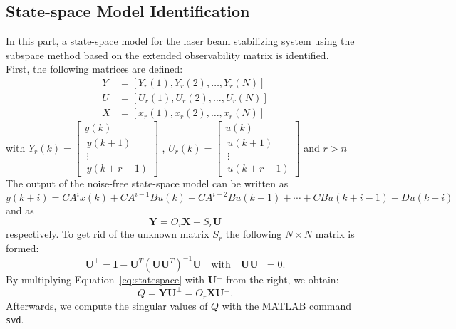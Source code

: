 \subsection{State-space Model Identification}
In this part, a state-space model for the laser beam stabilizing system using the subspace method based on the extended observability matrix is identified. \\
First, the following matrices are defined: 
\begin{align}
 Y &= \left[Y_r(1), Y_r(2),\ldots,Y_r(N) \right] \\
 U &= \left[U_r(1), U_r(2),\ldots,U_r(N) \right] \\
 X &= \left[x_r(1), x_r(2),\ldots,x_r(N) \right]
\end{align}
with 
\quad $Y_r(k) = \left[ \begin{array}{c} y(k) \\\ y(k+1) \\\ \vdots \\\ y(k + r -1) \end{array}\right] $ , \quad $U_r(k) = \left[ \begin{array}{c} u(k) \\\ u(k+1) \\\ \vdots \\\ u(k + r -1) \end{array}\right] $ \quad and \quad $r > n $\\
The output of the noise-free state-space model can be written as
\begin{equation}
y(k+i) = CA^{i}x(k) + CA^{i-1}Bu(k) + CA^{i-2}Bu(k+1) + \cdots + CBu(k+i-1) + Du(k+i)
\end{equation}
and as 
\begin{equation}
\textbf{Y} = O_r \textbf{X} + S_r \textbf{U}
\label{eq:statespace}
\end{equation}
respectively. 
To get rid of the unknown matrix $S_r$ the following $ N \times N $ matrix is formed: 
\begin{equation}
\textbf{U}^{\bot} = \textbf{I} - \textbf{U}^{T}(\textbf{U}\textbf{U}^{T})^{-1}\textbf{U} \quad \text{with} \quad \textbf{U}\textbf{U}^{\bot} = 0.
\end{equation}
By multiplying Equation~\ref{eq:statespace} with $\textbf{U}^{\bot}$ from the right, we obtain:
\begin{equation}
	Q = \textbf{Y}\textbf{U}^{\bot} = O_r\textbf{X}\textbf{U}^{\bot}.
\end{equation}
Afterwards, we compute the singular values of $Q$ with the MATLAB command \texttt{svd}. 
